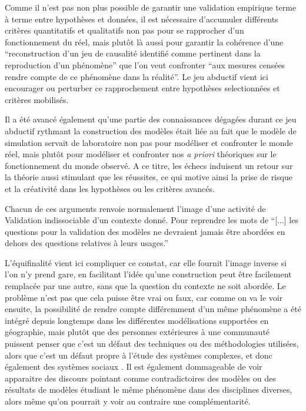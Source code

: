 Comme il n'est pas non plus possible de garantir une validation empirique terme à terme entre hypothèses et données, il est nécessaire d'accumuler différents critères quantitatifs et qualitatifs non pas pour se rapprocher d'un fonctionnement du réel, mais plutôt là aussi pour garantir la cohérence d'une \enquote{reconstruction d'un jeu de causalité identifié comme pertinent dans la reproduction d'un phénomène} que l'on veut confronter \enquote{aux mesures censées rendre compte de ce phénomène dans la réalité}. Le jeu abductif vient ici encourager ou perturber ce rapprochement entre hypothèses selectionnées et critères mobilisés.

Il a été avancé également qu'une partie des connaissances dégagées durant ce jeu abductif rythmant la construction des modèles était liée au fait que le modèle de simulation servait de laboratoire non pas pour modéliser et confronter le monde réel, mais plutôt pour modéliser et confronter nos \textit{a priori} théoriques sur le fonctionnement du monde observé. A ce titre, les échecs induisent un retour sur la théorie aussi stimulant que les réussites, ce qui motive ainsi la prise de risque et la créativité dans les hypothèses ou les critères avancés.

Chacun de ces arguments renvoie normalement l'image d'une activité de Validation indissociable d'un contexte donné. Pour reprendre les mots de \textcite{Amblard2006} \enquote{[...] les questions pour la validation des modèles ne devraient jamais être abordées en dehors des questions relatives à leurs usages.}

L'équifinalité vient ici compliquer ce constat, car elle fournit l'image inverse si l'on n'y prend gare, en facilitant l'idée qu'une construction peut être facilement remplacée par une autre, sans que la question du contexte ne soit abordée. Le problème n'est pas que cela puisse être vrai ou faux, car comme on va le voir ensuite, la possibilité de rendre compte différemment d'un même phénomène a été intégré depuis longtemps dans les différentes modélisations supportées en géographie, mais plutôt que des personnes extérieures à une communauté puissent penser que c'est un défaut des techniques ou des méthodologies utilisées, alors que c'est un défaut propre à l'étude des systèmes complexes, et donc également des systèmes sociaux \autocite{Elsenbroich2012}. Il est également dommageable de voir apparaitre des discours pointant comme contradictoires des modèles ou des résultats de modèles étudiant le même phénomène dans des disciplines diverses, alors même qu'on pourrait y voir au contraire une complémentarité.  

